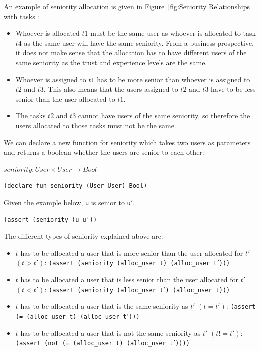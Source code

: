 \documentclass[a4paper]{report}
\begin{document}
An example of seniority allocation is given in Figure~\ref{fig:Seniority Relationships with tasks}:
\begin{itemize}
\item Whoever is allocated $t1$ must be the same user as whoever is allocated to task $t4$ as the same user will have the same seniority. From a business prospective, it does not make sense that the allocation has to have different users of the same seniority as the trust and experience levels are the same. 
\item Whoever is assigned to $t1$ has to be more senior than whoever is assigned to $t2$ and $t3$. This also means that the users assigned to $t2$ and $t3$ have to be less senior than the user allocated to $t1$.
\item The tasks $t2$ and $t3$ cannot have users of the same seniority, so therefore the users allocated to those tasks must not be the same.
\end{itemize}

We can declare a new function for seniority which takes two users as parameters and returns a boolean whether the users are senior to each other:
\begin{center}
$seniority : User \times User \rightarrow Bool$
\end{center}
\begin{lstlisting}[frame=single]
(declare-fun seniority (User User) Bool)
\end{lstlisting}

Given the example below, \texttt{u} is senior to \texttt{u\ensuremath{'}}.
\begin{lstlisting}[frame=single]
(assert (seniority (u u'))
\end{lstlisting}

The different types of seniority explained above are:
\begin{itemize}
\item $t$ has to be allocated a user that is more senior than the user allocated for $t\ensuremath{'}$ $(t > t\ensuremath{'})$: \texttt{(assert (seniority (alloc\_user t) (alloc\_user t\ensuremath{'})))}
\item $t$ has to be allocated a user that is less senior than the user allocated for $t\ensuremath{'}$ $(t < t\ensuremath{'})$: \texttt{(assert (seniority (alloc\_user t\ensuremath{'}) (alloc\_user t)))}
\item $t$ has to be allocated a user that is the same seniority as $t\ensuremath{'}$ $(t = t\ensuremath{'})$: \texttt{(assert (= (alloc\_user t) (alloc\_user t\ensuremath{'})))}
\item $t$ has to be allocated a user that is not the same seniority as $t\ensuremath{'}$ $(t != t\ensuremath{'})$: \texttt{(assert (not (= (alloc\_user t) (alloc\_user t\ensuremath{'}))))}
\end{itemize}
\end{document}
